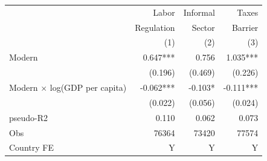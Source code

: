  \begin{tabular}{lrrr}\hline
 & Labor          & Informal   & Taxes  \\
 & Regulation & Sector     & Barrier   \\
 & (1)        & (2)        & (3)        \\ \hline
Modern&0.647***&0.756&1.035***\\
&(0.196)&(0.469)&(0.226)\\
Modern $\times$ log(GDP per capita)&-0.062***&-0.103*&-0.111***\\
&(0.022)&(0.056)&(0.024)\\
pseudo-R2&0.110&0.062&0.073\\
Obs&76364&73420&77574\\
\hline
Country FE                             & Y & Y & Y \\
\hline\end{tabular}
